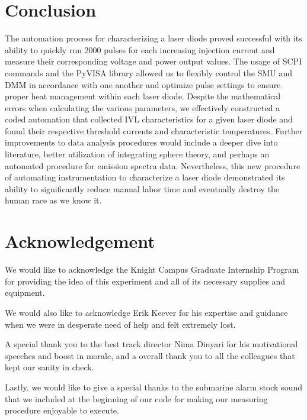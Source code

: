 \documentclass[9pt,twocolumn,twoside]{osajnl}
\begin{document}
\indent \indent 

\section{Conclusion}

\indent \indent The automation process for characterizing a laser diode proved successful with its ability to quickly run 2000 pulses for each increasing injection current and measure their corresponding voltage and power output values. The usage of SCPI commands and the PyVISA library allowed us to flexibly control the SMU and DMM in accordance with one another and optimize pulse settings to ensure proper heat management within each laser diode. Despite the mathematical errors when calculating the various parameters, we effectively constructed a coded automation that collected IVL characteristics for a given laser diode and found their respective threshold currents and characteristic temperatures. Further improvements to data analysis procedures would include a deeper dive into literature, better utilization of integrating sphere theory, and perhaps an automated procedure for emission spectra data. Nevertheless, this new procedure of automating instrumentation to characterize a laser diode demonstrated its ability to significantly reduce manual labor time and eventually destroy the human race as we know it. 


\section*{Acknowledgement}
\indent \indent We would like to acknowledge the Knight Campus Graduate Internship Program for providing the idea of this experiment and all of its necessary supplies and equipment. 

We would also like to acknowledge Erik Keever for his expertise and guidance when we were in desperate need of help and felt extremely lost.

A special thank you to the best track director Nima Dinyari for his motivational speeches and boost in morale, and a overall thank you to all the colleagues that kept our sanity in check.

Lastly, we would like to give a special thanks to the submarine alarm stock sound that we included at the beginning of our code for making our measuring procedure enjoyable to execute.


\end{document}
